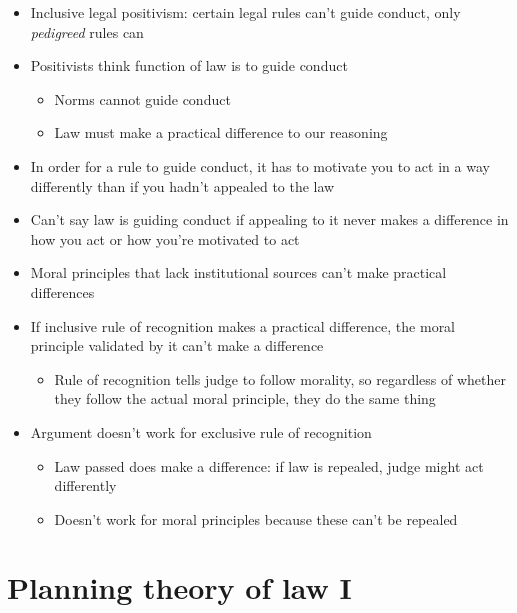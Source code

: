 \begin{itemize}
\tightlist
\item
  Inclusive legal positivism: certain legal rules can't guide conduct,
  only \emph{pedigreed} rules can
\item
  Positivists think function of law is to guide conduct

  \begin{itemize}
  \tightlist
  \item
    Norms cannot guide conduct
  \item
    Law must make a practical difference to our reasoning
  \end{itemize}
\item
  In order for a rule to guide conduct, it has to motivate you to act in
  a way differently than if you hadn't appealed to the law
\item
  Can't say law is guiding conduct if appealing to it never makes a
  difference in how you act or how you're motivated to act
\item
  Moral principles that lack institutional sources can't make practical
  differences
\item
  If inclusive rule of recognition makes a practical difference, the
  moral principle validated by it can't make a difference

  \begin{itemize}
  \tightlist
  \item
    Rule of recognition tells judge to follow morality, so regardless of
    whether they follow the actual moral principle, they do the same
    thing
  \end{itemize}
\item
  Argument doesn't work for exclusive rule of recognition

  \begin{itemize}
  \tightlist
  \item
    Law passed does make a difference: if law is repealed, judge might
    act differently
  \item
    Doesn't work for moral principles because these can't be repealed
  \end{itemize}
\end{itemize}

\hypertarget{planning-theory-of-law-i}{%
\section{Planning theory of law I}\label{planning-theory-of-law-i}}

